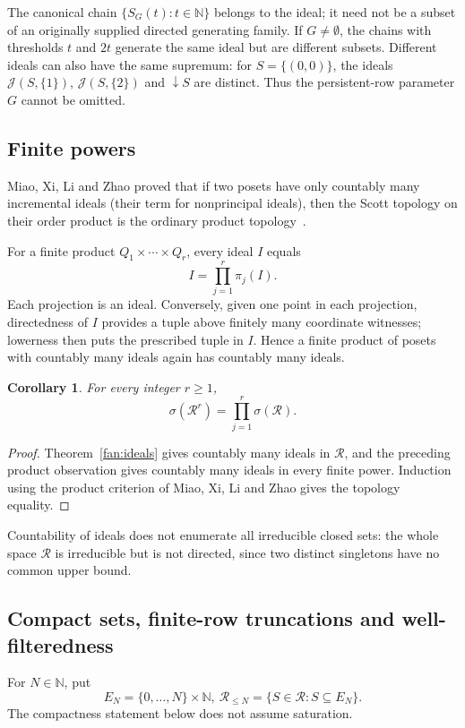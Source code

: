 \documentclass[10pt,a4paper]{article}
\newtheorem{corollary}[theorem]{Corollary}
\theoremstyle{definition}
\newcommand{\N}{\mathbb N}
\newcommand{\RR}{\mathcal R}
\begin{document}
The canonical chain $\{S_G(t):t\in\N\}$ belongs to the ideal; it need not be a subset of an originally supplied directed generating family. If $G\neq\emptyset$, the chains with thresholds $t$ and $2t$ generate the same ideal but are different subsets. Different ideals can also have the same supremum: for $S=\{(0,0)\}$, the ideals $\mathcal J(S,\{1\})$, $\mathcal J(S,\{2\})$ and ${\downarrow} S$ are distinct. Thus the persistent-row parameter $G$ cannot be omitted.

\subsection{Finite powers}
Miao, Xi, Li and Zhao proved that if two posets have only countably many incremental ideals (their term for nonprincipal ideals), then the Scott topology on their order product is the ordinary product topology~\cite[Lemma~4.1, pp.~827--829]{MXLZ}.

For a finite product $Q_1\times\cdots\times Q_r$, every ideal $I$ equals
\[
 I=\prod_{j=1}^r\pi_j(I).
\]
Each projection is an ideal. Conversely, given one point in each projection, directedness of $I$ provides a tuple above finitely many coordinate witnesses; lowerness then puts the prescribed tuple in $I$. Hence a finite product of posets with countably many ideals again has countably many ideals.

\begin{corollary}\label{fan:finitepowers}
For every integer $r\geq1$,
\[
 \sigma(\RR^r)=\prod_{j=1}^r\sigma(\RR).
\]
\end{corollary}
\begin{proof}
Theorem~\ref{fan:ideals} gives countably many ideals in $\RR$, and the preceding product observation gives countably many ideals in every finite power. Induction using the product criterion of Miao, Xi, Li and Zhao gives the topology equality.
\end{proof}

Countability of ideals does not enumerate all irreducible closed sets: the whole space $\RR$ is irreducible but is not directed, since two distinct singletons have no common upper bound.


\subsection{Compact sets, finite-row truncations and well-filteredness}
For $N\in\N$, put
\[
 E_N=\{0,\ldots,N\}\times\N,
 ~
 \RR_{\leq N}=\{S\in\RR:S\subseteq E_N\}.
\]
The compactness statement below does not assume saturation.
\end{document}
